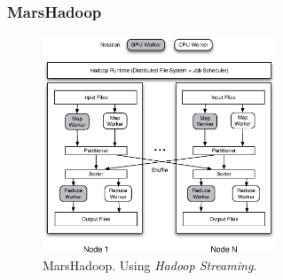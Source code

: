 \begin{frame}
\frametitle{MarsHadoop}
\begin{figure}[ht]
  \centering
  \includegraphics[width=0.62\textwidth]{figure/hadoop.eps} 
  \caption{MarsHadoop. Using {\em Hadoop Streaming}.}\label{fig:hadoop}
\end{figure}
\end{frame}
